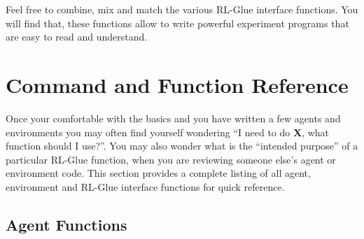 \documentclass[11pt]{article}
\begin{document}
Feel free to combine, mix and match the various RL-Glue interface functions. You will find that, these functions allow to write powerful experiment programs that are easy to read and understand. 





\section{Command and Function Reference}
\label{ref}
Once your comfortable with the basics and you have written a few agents and environments you may often find yourself wondering ``I need to do {\bf X}, what function should I use?''. You may also wonder what is the ``intended purpose'' of a particular RL-Glue function, when you are reviewing someone else's agent or environment code. This section provides a complete listing of all agent, environment and RL-Glue interface functions for quick reference.
\subsection{Agent Functions}
 
\end{document}

